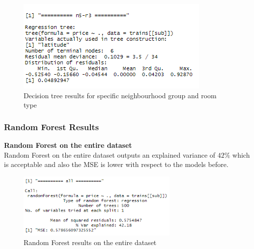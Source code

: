 \documentclass{FR16}
\begin{document}
\begin{figure}[!htb]
   
    \begin{minipage}{0.48\textwidth}
     \centering
     \includegraphics[width=.7\linewidth]{figures/dt4.2.PNG}
   \end{minipage}
        \caption{ Decision tree results for specific neighbourhood group and room type}\label{fig:12}

\end{figure}

\newpage
\subsubsection{Random Forest Results}
\textbf{Random Forest  on the entire dataset}\\
Random Forest on the entire dataset outputs an explained variance of $42\%$ which is acceptable and also the MSE is lower with respect to the models before. 
\begin{figure}[h]
\centering
\includegraphics[width=0.7\textwidth]{figures/rf.PNG} 
 \caption{\label{fig:13} Random Forest results on the entire dataset}
\end{figure}
\end{document}
